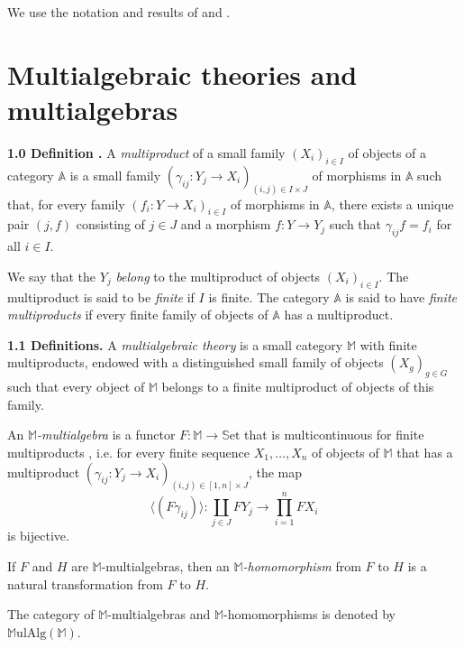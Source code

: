 \documentclass{article}
\newenvironment{rmenv}[1]
  {\phantomsection\par\medskip\noindent\textbf{#1.}\rmfamily}
  {\medskip}
\newcommand{\bb}[1]{{\mathbb{#1}}}
\newcommand{\Set}{\mathbb{S}\mathrm{et}}
\newcommand{\MulAlg}{\mathbb{M}\mathrm{ulAlg}}
\newcommand{\oldpage}[1]{\marginpar{\footnotesize$\Big\vert$ \textit{p.~#1}}}
\begin{document}
We use the notation and results of \cite{2} and \cite{3}.

\oldpage{194}
\section{Multialgebraic theories and multialgebras}

\begin{rmenv}{1.0 Definition \cite{2}}
  A \emph{multiproduct} of a small family $(X_i)_{i\in I}$ of objects of a category $\bb{A}$ is a small family $(\gamma_{ij}\colon Y_j\to X_i)_{(i,j)\in I\times J}$ of morphisms in $\bb{A}$ such that, for every family $(f_i\colon Y\to X_i)_{i\in I}$ of morphisms in $\bb{A}$, there exists a unique pair $(j,f)$ consisting of $j\in J$ and a morphism $f\colon Y\to Y_j$ such that $\gamma_{ij}f=f_i$ for all $i\in I$.

  We say that the $Y_j$ \emph{belong} to the multiproduct of objects $(X_i)_{i\in I}$.
  The multiproduct is said to be \emph{finite} if $I$ is finite.
  The category $\bb{A}$ is said to have \emph{finite multiproducts} if every finite family of objects of $\bb{A}$ has a multiproduct.
\end{rmenv}

\begin{rmenv}{1.1 Definitions}
  A \emph{multialgebraic theory} is a small category $\bb{M}$ with finite multiproducts, endowed with a distinguished small family of objects $(X_g)_{g\in G}$ such that every object of $\bb{M}$ belongs to a finite multiproduct of objects of this family.

  An \emph{$\bb{M}$-multialgebra} is a functor $F\colon\bb{M}\to\Set$ that is multicontinuous for finite multiproducts \cite{2}, i.e. for every finite sequence $X_1,\ldots,X_n$ of objects of $\bb{M}$ that has a multiproduct $(\gamma_{ij}\colon Y_j\to X_i)_{(i,j)\in[1,n]\times J}$, the map
  \[
    \langle(F\gamma_{ij})\rangle\colon
    \coprod_{j\in J} FY_j \to
    \prod_{i=1}^n FX_i
  \]
  is bijective.

  If $F$ and $H$ are $\bb{M}$-multialgebras, then an \emph{$\bb{M}$-homomorphism} from $F$ to $H$ is a natural transformation from $F$ to $H$.

  The category of $\bb{M}$-multialgebras and $\bb{M}$-homomorphisms is denoted by $\MulAlg(\bb{M})$.
\end{rmenv}
\end{document}
